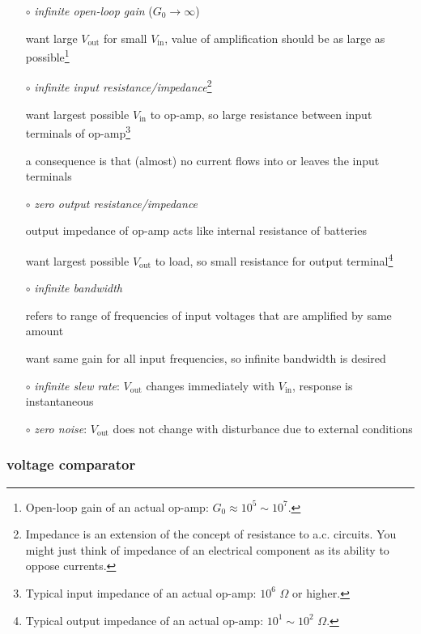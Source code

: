 \begin{itemize}[leftmargin=\parindent]
	\item[$\circ$] \emph{infinite open-loop gain} ($G_0 \to \infty$)
	
	want large $V_\text{out}$ for small $V_\text{in}$, value of amplification should be as large as possible\footnote{Open-loop gain of an actual op-amp: $G_0 \approx 10^5 \sim 10^7$.}
	
	\item[$\circ$] \emph{infinite input resistance/impedance}\footnote{Impedance is an extension of the concept of resistance to a.c. circuits. You might just think of impedance of an electrical component as its ability to oppose currents.}
	
	want largest possible $V_\text{in}$ to op-amp, so large resistance between input terminals of op-amp\footnote{Typical input impedance of an actual op-amp: $10^6$ $\Omega$ or higher.}
	
	a consequence is that (almost) no current flows into or leaves the input terminals
		
	
	\item[$\circ$] \emph{zero output resistance/impedance}
	
	output impedance of op-amp acts like internal resistance of batteries
	
	want largest possible $V_\text{out}$ to load, so small resistance for output terminal\footnote{Typical output impedance of an actual op-amp: $10^1\sim10^2$ $\Omega$.}
	
	\item[$\circ$] \emph{infinite bandwidth}
	
	 refers to range of frequencies of input voltages that are amplified by same amount
	
	want same gain for all input frequencies, so infinite bandwidth is desired
	
	\item[$\circ$] \emph{infinite slew rate}: $V_\text{out}$ changes immediately with $V_\text{in}$, response is instantaneous
	
	\item[$\circ$] \emph{zero noise}: $V_\text{out}$ does not change with disturbance due to external conditions
\end{itemize}

\subsubsection{voltage comparator}

